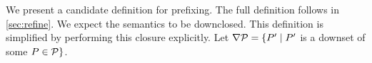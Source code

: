 We present a candidate definition for prefixing.  The full definition follows
in \textsection\ref{sec:refine}.   We expect the semantics to be downclosed.
This definition is simplified by performing this closure explicitly.
Let $\nabla \mathcal{P}=\{P'\mid P'$ is a downset of some $P \in \mathcal{P}\}$.
  



  


